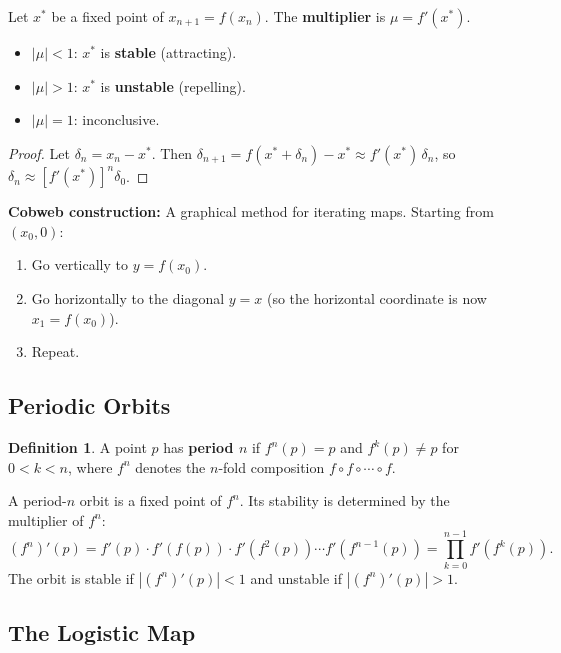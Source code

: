 \documentclass[11pt,letterpaper]{article}
\theoremstyle{definition}
\newtheorem{definition}{Definition}[section]
\theoremstyle{plain}
\theoremstyle{remark}
\newcommand{\xstar}{x^*}
\begin{document}
\begin{keyresult}
Let $\xstar$ be a fixed point of $x_{n+1}=f(x_n)$.  The \textbf{multiplier}
is $\mu = f'(\xstar)$.
\begin{itemize}[leftmargin=2em]
\item $|\mu| < 1$: $\xstar$ is \textbf{stable} (attracting).
\item $|\mu| > 1$: $\xstar$ is \textbf{unstable} (repelling).
\item $|\mu| = 1$: inconclusive.
\end{itemize}
\end{keyresult}

\begin{proof}
Let $\delta_n = x_n - \xstar$.  Then
$\delta_{n+1} = f(\xstar + \delta_n) - \xstar \approx f'(\xstar)\,\delta_n$,
so $\delta_n \approx [f'(\xstar)]^n \delta_0$.
\end{proof}

\textbf{Cobweb construction:}  A graphical method for iterating maps.
Starting from $(x_0, 0)$:
\begin{enumerate}[leftmargin=2em]
\item Go vertically to $y = f(x_0)$.
\item Go horizontally to the diagonal $y = x$ (so the horizontal
      coordinate is now $x_1 = f(x_0)$).
\item Repeat.
\end{enumerate}

\subsection{Periodic Orbits}

\begin{definition}
A point $p$ has \textbf{period $n$} if $f^n(p) = p$ and $f^k(p)\neq p$
for $0 < k < n$, where $f^n$ denotes the $n$-fold composition
$f\circ f\circ\cdots\circ f$.
\end{definition}

A period-$n$ orbit is a fixed point of $f^n$.  Its stability is determined
by the multiplier of $f^n$:
\begin{equation}
  (f^n)'(p) = f'(p)\cdot f'(f(p))\cdot f'(f^2(p))\cdots f'(f^{n-1}(p))
  = \prod_{k=0}^{n-1} f'(f^k(p)).
\end{equation}
The orbit is stable if $|(f^n)'(p)| < 1$ and unstable if $|(f^n)'(p)| > 1$.

\subsection{The Logistic Map}\label{sec:logistic}
\end{document}
